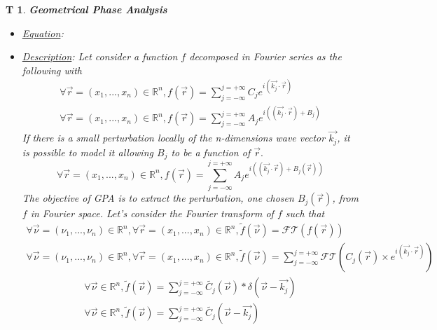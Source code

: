 \documentclass[12pt]{article}
\newtheorem{T}{T}
\begin{document}
\begin{T}
\label{T_2}
\noindent\colorbox{shadecolorT}{\normalfont \textbf{Geometrical Phase Analysis}}
\normalfont
\begin{itemize}
\item \underline{Equation}: 
\item \underline{Description}: Let consider a function $f$ decomposed in Fourier series as the following with 
\begin{equation}
\begin{gathered}
\forall \vec{r}=(x_1,...,x_n) \in \mathbb{R}^n, f(\vec{r})=\sum_{j=-\infty}^{j=+\infty}C_je^{i(\vec{k_j}\cdot\vec{r})} \\
\forall \vec{r}=(x_1,...,x_n) \in \mathbb{R}^n, f(\vec{r})=\sum_{j=-\infty}^{j=+\infty}A_je^{i((\vec{k_j}\cdot\vec{r})+B_j)}
\end{gathered}
\end{equation}
If there is a small perturbation locally of the n-dimensions wave vector $\vec{k_j}$, it is possible to model it allowing $B_j$ to be a function of $\vec{r}.$ 
\begin{equation}
\forall \vec{r}=(x_1,...,x_n) \in \mathbb{R}^n, f(\vec{r})=\sum_{j=-\infty}^{j=+\infty}A_je^{i((\vec{k_j}\cdot\vec{r})+B_j(\vec{r}))}
\end{equation}
The objective of GPA is to extract the perturbation, one chosen $B_j(\vec{r})$, from $f$ in Fourier space. Let's consider the Fourier transform of $f$ such that
\begin{equation*}
\begin{gathered}
\forall \vec{\nu}=(\nu_1,...,\nu_n) \in \mathbb{R}^n, \forall \vec{r}=(x_1,...,x_n) \in \mathbb{R}^n, \widetilde{f}(\vec{\nu})=\mathcal{FT}(f(\vec{r})) \\
\forall \vec{\nu}=(\nu_1,...,\nu_n) \in \mathbb{R}^n, \forall \vec{r}=(x_1,...,x_n) \in \mathbb{R}^n, \widetilde{f}(\vec{\nu})=\sum_{j=-\infty}^{j=+\infty}\mathcal{FT}(C_j(\vec{r})\times e^{i(\vec{k_j}\cdot\vec{r})})
\end{gathered}
\end{equation*}
\begin{equation}
\begin{gathered}
\forall \vec{\nu}\in \mathbb{R}^n, \widetilde{f}(\vec{\nu})=\sum_{j=-\infty}^{j=+\infty}\widetilde{C_j}(\vec{\nu})\ast\delta(\vec{\nu}-\vec{k_j})\\
\forall \vec{\nu}\in \mathbb{R}^n, \widetilde{f}(\vec{\nu})=\sum_{j=-\infty}^{j=+\infty}\widetilde{C_j}(\vec{\nu}-\vec{k_j})
\end{gathered}

\end{equation}
\end{itemize}
\end{T}
\end{document}
